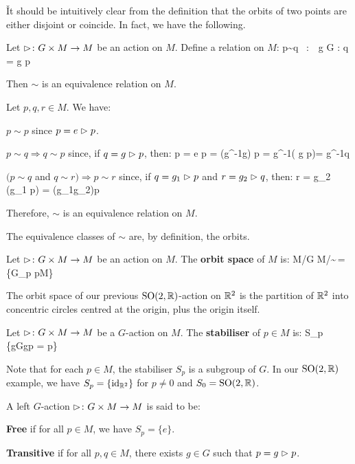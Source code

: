 \v

It should be intuitively clear from the definition that the orbits of two points are either disjoint or coincide. In 
fact, we have the following.

\bt[]
Let $\vartriangleright \colon G\times M \to M$ be an action on $M$. Define a relation on $M$:
\bse
p\sim q \ :\Leftrightarrow \ \exists \, g \in G : q = g \lacts p
\ese

Then $\sim$ is an equivalence relation on $M$.
\et

\bq
Let $p,q,r\in M$. We have:
\ben
[label=\roman*)]
\item $p\sim p$ since $p = e \vartriangleright p$.
\item $p\sim q \Rightarrow q\sim p$ since, if $q =g \vartriangleright p$, then:
\bse
p = e \lacts p = (g^{-1}\bullet g) \lacts p = g^{-1}\lacts( g \lacts p)= g^{-1}\lacts q
\ese

\item $(p\sim q$ and $q\sim r) \Rightarrow p\sim r$ since, if $q =g_1 \vartriangleright p$ and $r =g_2 \vartriangleright q$, then:
\bse
r = g_2 \lacts (g_1 \lacts p) = (g_1\bullet g_2)\lacts p
\ese
\een

Therefore, $\sim$ is an equivalence relation on $M$.
\eq

The equivalence classes of $\sim$ are, by definition, the orbits.

Let $\vartriangleright\colon G\times M\to M$ be an action on $M$. The \textbf{orbit space} of $M$ is:
\bse
M/G \coloneqq M/\!\sim \,= \{G_p \mid p\in M\}
\ese
\ed

\be
The orbit space of our previous $\operatorname{SO}(2,\mathbb{R})$-action on $\mathbb{R}^2$ is the partition of $\mathbb{R}^2$ into concentric circles 
centred at the origin, plus the origin itself. 
\ee

\bd [Stabiliser]
Let $\vartriangleright\colon G\times M\to M$ be a $G$-action on $M$. The \textbf{stabiliser} of $p\in M$ is:
\bse
S_p \coloneqq \{g\in G\mid g\lacts p = p\}
\ese
\ed

Note that for each $p\in M$, the stabiliser $S_p$ is a subgroup of $G$.
\be
In our $\operatorname{SO}(2,\mathbb{R})$ example, we have $S_p=\{\operatorname{id}_{\mathbb{R}^2}\}$ for $p\neq 0$ and $S_0=\operatorname{SO}(2,\mathbb{R})$.
\ee

A left $G$-action $\vartriangleright\colon G\times M\to M$ is said to be:
\ben[label=\roman*)]
\item \textbf{Free} if for all $p\in M$, we have $S_p=\{e\}$.
\item \textbf{Transitive} if for all $p,q\in M$, there exists $g\in G$ such that $p=g\vartriangleright p$.
\een
\ed

